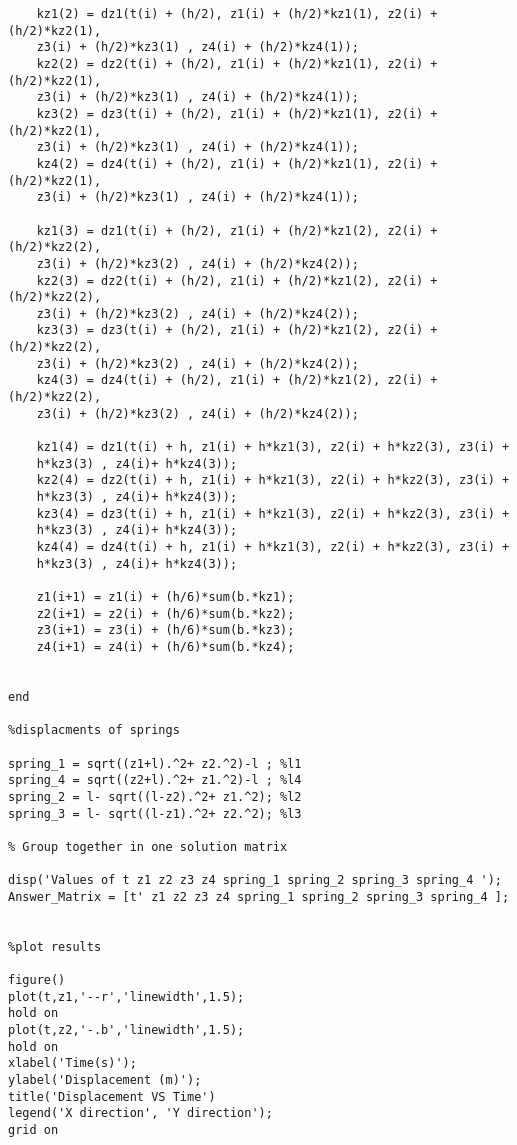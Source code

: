 \begin{framed}
\begin{verbatim}
    kz1(2) = dz1(t(i) + (h/2), z1(i) + (h/2)*kz1(1), z2(i) + (h/2)*kz2(1), 
    z3(i) + (h/2)*kz3(1) , z4(i) + (h/2)*kz4(1));
    kz2(2) = dz2(t(i) + (h/2), z1(i) + (h/2)*kz1(1), z2(i) + (h/2)*kz2(1), 
    z3(i) + (h/2)*kz3(1) , z4(i) + (h/2)*kz4(1));
    kz3(2) = dz3(t(i) + (h/2), z1(i) + (h/2)*kz1(1), z2(i) + (h/2)*kz2(1), 
    z3(i) + (h/2)*kz3(1) , z4(i) + (h/2)*kz4(1));
    kz4(2) = dz4(t(i) + (h/2), z1(i) + (h/2)*kz1(1), z2(i) + (h/2)*kz2(1), 
    z3(i) + (h/2)*kz3(1) , z4(i) + (h/2)*kz4(1));
    
    kz1(3) = dz1(t(i) + (h/2), z1(i) + (h/2)*kz1(2), z2(i) + (h/2)*kz2(2), 
    z3(i) + (h/2)*kz3(2) , z4(i) + (h/2)*kz4(2));
    kz2(3) = dz2(t(i) + (h/2), z1(i) + (h/2)*kz1(2), z2(i) + (h/2)*kz2(2), 
    z3(i) + (h/2)*kz3(2) , z4(i) + (h/2)*kz4(2));
    kz3(3) = dz3(t(i) + (h/2), z1(i) + (h/2)*kz1(2), z2(i) + (h/2)*kz2(2), 
    z3(i) + (h/2)*kz3(2) , z4(i) + (h/2)*kz4(2));
    kz4(3) = dz4(t(i) + (h/2), z1(i) + (h/2)*kz1(2), z2(i) + (h/2)*kz2(2), 
    z3(i) + (h/2)*kz3(2) , z4(i) + (h/2)*kz4(2));

    kz1(4) = dz1(t(i) + h, z1(i) + h*kz1(3), z2(i) + h*kz2(3), z3(i) +
    h*kz3(3) , z4(i)+ h*kz4(3));
    kz2(4) = dz2(t(i) + h, z1(i) + h*kz1(3), z2(i) + h*kz2(3), z3(i) + 
    h*kz3(3) , z4(i)+ h*kz4(3));
    kz3(4) = dz3(t(i) + h, z1(i) + h*kz1(3), z2(i) + h*kz2(3), z3(i) + 
    h*kz3(3) , z4(i)+ h*kz4(3));
    kz4(4) = dz4(t(i) + h, z1(i) + h*kz1(3), z2(i) + h*kz2(3), z3(i) +
    h*kz3(3) , z4(i)+ h*kz4(3));
    
    z1(i+1) = z1(i) + (h/6)*sum(b.*kz1);      
    z2(i+1) = z2(i) + (h/6)*sum(b.*kz2);      
    z3(i+1) = z3(i) + (h/6)*sum(b.*kz3);
    z4(i+1) = z4(i) + (h/6)*sum(b.*kz4);
     
    
end   

%displacments of springs

spring_1 = sqrt((z1+l).^2+ z2.^2)-l ; %l1
spring_4 = sqrt((z2+l).^2+ z1.^2)-l ; %l4
spring_2 = l- sqrt((l-z2).^2+ z1.^2); %l2
spring_3 = l- sqrt((l-z1).^2+ z2.^2); %l3

% Group together in one solution matrix

disp('Values of t z1 z2 z3 z4 spring_1 spring_2 spring_3 spring_4 ');
Answer_Matrix = [t' z1 z2 z3 z4 spring_1 spring_2 spring_3 spring_4 ];


%plot results

figure()
plot(t,z1,'--r','linewidth',1.5);
hold on
plot(t,z2,'-.b','linewidth',1.5);
hold on
xlabel('Time(s)');
ylabel('Displacement (m)');
title('Displacement VS Time')
legend('X direction', 'Y direction');
grid on


\end{verbatim}
\end{framed}
